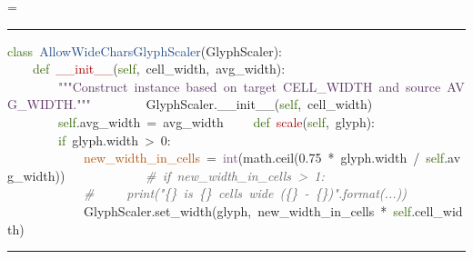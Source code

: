 \documentclass{article}
\makeatletter
\newcommand*{\ESHFontSize}{}
\newcommand*{\ESHFontFamily}{\ttfamily}
\newcommand*{\ESHBlockFontSize}{\ESHFontSize}
\newcommand*{\ESHBlockFontFamily}{\ESHFontFamily}
\newcommand*{\ESHBlockFont}{\ESHBlockFontSize\ESHBlockFontFamily}
\newcommand*{\ESHFallbackFontFamily}{\ESHFontFamily}
\newcommand*{\ESHFallbackFont}{\ESHFallbackFontFamily}
\newcommand*{\ESHNoHyphens}{\hyphenpenalty=10000}
\newcommand*{\ESHConstantSpace}{\spaceskip=\fontdimen2\font\xspaceskip=0pt}
\newcommand*{\ESHCenterInWidthOf}[2]
  {\settowidth\ESHtempdim{#1}%
   \makebox[\ESHtempdim][c]{#2}}
\newcommand*{\ESHIfFontChar}[1]
  {\iffontchar\font`#1{#1}\else{\ESHFallbackFont#1}\fi}
\def\ESHWithFallback#1{\ESHFallbackFont#1}}
\def\ESHWithFallback#1{\ESHIfFontChar{#1}}}}
\def\ESHWithFallback#1{%
     \ifnum\XeTeXfonttype\font>0%
       \ESHIfFontChar{#1}%
     \else%
       \setbox0=\hbox{\tracinglostchars=0\kern1sp#1\expandafter}%
       \ifnum\lastkern=1{\ESHFallbackFont#1}\else{#1}\fi
     \fi}}
\DeclareRobustCommand*{\ESHBlockSpecialChar}[1]
  {{\ESHCenterInWidthOf{\ESHBlockFontFamily{a}}{\ESHBlockFontFamily\ESHWithFallback{#1}}}}
\DeclareRobustCommand*{\ESHBlockUnicodeSubstitution}[1]
  {{\ESHCenterInWidthOf{\ESHBlockFontFamily{a}}{\ESHBlockFontFamily#1}}}
\newlength{\ESHCurFontSize}
\newcommand*{\ESHSetCurFontSize}{\setlength{\ESHCurFontSize}{\f@size pt}}
\DeclareRobustCommand*{\ESHInlineRaise}[2]
  {\ESHSetCurFontSize\raisebox{#1\ESHCurFontSize}{\relsize{-2}#2}}
\DeclareRobustCommand*{\ESHBlockRaise}[2]
  {\rlap{\ESHInlineRaise{#1}{#2}}\hphantom{#2}}
\newlength{\ESHBaselineskip}
\DeclareRobustCommand*{\ESHBlockStrut}[1]
  {\rule{0pt}{#1\ESHBaselineskip}}
\newcommand*{\ESHBlockSlantItalic}[1]{{\itshape{#1}}} %
\newcommand*{\ESHNonbreakingSpace}{~}
\let\ESHSpecialChar\ignorespaces%
\let\ESHUnicodeSubstitution\ignorespaces%
\let\ESHRaise\ignorespaces%
\let\ESHBol\ignorespaces%
\let\ESHEol\ignorespaces%
\let\ESHSpace\ignorespaces%
\let\ESHDash\ignorespaces%
\let\ESHSlantItalic\ignorespaces%
\DeclareRobustCommand*{\ESHBlockInternalSetup}
  {\def\ESHSpecialChar{\ESHBlockSpecialChar}\def\ESHUnicodeSubstitution{\ESHBlockUnicodeSubstitution}%
   \def\ESHRaise{\ESHBlockRaise}\def\ESHSlantItalic{\ESHBlockSlantItalic}%
   \setlength{\ESHBaselineskip}{\baselineskip}\def\ESHStrut{\ESHBlockStrut}%
   \def\ESHBol{\-}\def\ESHEol{\newline}\def\ESHSpace{\ESHNonbreakingSpace}\def\ESHDash{\hbox{-}\nobreak}}
\newcommand*{\ESHBlockBasicSetup}
  {\setlength{\parindent}{0pt}\raggedright\ESHNoHyphens%
   \ESHBlockFont\ESHConstantSpace}
\newcommand*{\ESHHook}{}
\newcommand*{\ESHBlockHook}{\ESHHook}
\newlength{\ESHSkip}
\newcommand*{\ESHNoBreakAddVSpace}[1]{\addpenalty{\@M}\addvspace{#1}}
\newenvironment{ESHBlock}
  {\par\ESHNoBreakAddVSpace{\ESHSkip}\bgroup\ESHBlockInternalSetup\ESHBlockBasicSetup\ESHBlockHook}
  {\par\egroup\addvspace{\ESHSkip}}
\renewcommand{\ESHFontFamily}{\UbuntuMono}
\renewcommand{\ESHFallbackFontFamily}{\XITSMath}
\renewenvironment{ESHBlock}{%
  \par\ESHNoBreakAddVSpace{\ESHSkip}\bgroup\ESHBlockInternalSetup\ESHBlockBasicSetup%
  \hrule\addvspace{0.5em}%
}{%
  \par\egroup\addvspace{0.5em}\hrule\addvspace{2\ESHSkip}%
}
\makeatother
\begin{document}
\begin{ESHBlock}
\ESHBol{}\textcolor[HTML]{346604}{class}\ESHSpace{}\textcolor[HTML]{204A87}{AllowWideCharsGlyphScaler}(GlyphScaler):\ESHEol
\ESHBol{}\ESHSpace{}\ESHSpace{}\ESHSpace{}\ESHSpace{}\textcolor[HTML]{346604}{def}\ESHSpace{}\textcolor[HTML]{A40000}{\_\_init\_\_}(\textcolor[HTML]{346604}{self},\ESHSpace{}cell\_width,\ESHSpace{}avg\_width):\ESHEol
\ESHBol{}\ESHSpace{}\ESHSpace{}\ESHSpace{}\ESHSpace{}\ESHSpace{}\ESHSpace{}\ESHSpace{}\ESHSpace{}\textcolor[HTML]{5C3566}{"""Construct\ESHSpace{}instance\ESHSpace{}based\ESHSpace{}on\ESHSpace{}target\ESHSpace{}CELL\_WIDTH\ESHSpace{}and\ESHSpace{}source\ESHSpace{}AVG\_WIDTH."""}\ESHEol
\ESHBol{}\ESHSpace{}\ESHSpace{}\ESHSpace{}\ESHSpace{}\ESHSpace{}\ESHSpace{}\ESHSpace{}\ESHSpace{}GlyphScaler.\_\_init\_\_(\textcolor[HTML]{346604}{self},\ESHSpace{}cell\_width)\ESHEol
\ESHBol{}\ESHSpace{}\ESHSpace{}\ESHSpace{}\ESHSpace{}\ESHSpace{}\ESHSpace{}\ESHSpace{}\ESHSpace{}\textcolor[HTML]{346604}{self}.avg\_width\ESHSpace{}=\ESHSpace{}avg\_width\ESHEol
\ESHBol{}\mbox{}\ESHEol
\ESHBol{}\ESHSpace{}\ESHSpace{}\ESHSpace{}\ESHSpace{}\textcolor[HTML]{346604}{def}\ESHSpace{}\textcolor[HTML]{A40000}{scale}(\textcolor[HTML]{346604}{self},\ESHSpace{}glyph):\ESHEol
\ESHBol{}\ESHSpace{}\ESHSpace{}\ESHSpace{}\ESHSpace{}\ESHSpace{}\ESHSpace{}\ESHSpace{}\ESHSpace{}\textcolor[HTML]{346604}{if}\ESHSpace{}glyph.width\ESHSpace{}{>}\ESHSpace{}0:\ESHEol
\ESHBol{}\ESHSpace{}\ESHSpace{}\ESHSpace{}\ESHSpace{}\ESHSpace{}\ESHSpace{}\ESHSpace{}\ESHSpace{}\ESHSpace{}\ESHSpace{}\ESHSpace{}\ESHSpace{}\textcolor[HTML]{B35000}{new\_width\_in\_cells}\ESHSpace{}=\ESHSpace{}\textcolor[HTML]{75507B}{int}(math.ceil(0.75\ESHSpace{}*\ESHSpace{}glyph.width\ESHSpace{}/\ESHSpace{}\textcolor[HTML]{346604}{self}.avg\_width))\ESHEol
\ESHBol{}\ESHSpace{}\ESHSpace{}\ESHSpace{}\ESHSpace{}\ESHSpace{}\ESHSpace{}\ESHSpace{}\ESHSpace{}\ESHSpace{}\ESHSpace{}\ESHSpace{}\ESHSpace{}\ESHSlantItalic{\textcolor[HTML]{5F615C}{\#\ESHSpace{}if\ESHSpace{}new\_width\_in\_cells\ESHSpace{}{>}\ESHSpace{}1:}}\ESHEol
\ESHBol{}\ESHSpace{}\ESHSpace{}\ESHSpace{}\ESHSpace{}\ESHSpace{}\ESHSpace{}\ESHSpace{}\ESHSpace{}\ESHSpace{}\ESHSpace{}\ESHSpace{}\ESHSpace{}\ESHSlantItalic{\textcolor[HTML]{5F615C}{\#\ESHSpace{}\ESHSpace{}\ESHSpace{}\ESHSpace{}\ESHSpace{}print("\{\}\ESHSpace{}is\ESHSpace{}\{\}\ESHSpace{}cells\ESHSpace{}wide\ESHSpace{}(\{\}\ESHSpace{}\ESHDash{}{>}\ESHSpace{}\{\})".format(...))}}\ESHEol
\ESHBol{}\ESHSpace{}\ESHSpace{}\ESHSpace{}\ESHSpace{}\ESHSpace{}\ESHSpace{}\ESHSpace{}\ESHSpace{}\ESHSpace{}\ESHSpace{}\ESHSpace{}\ESHSpace{}GlyphScaler.set\_width(glyph,\ESHSpace{}new\_width\_in\_cells\ESHSpace{}*\ESHSpace{}\textcolor[HTML]{346604}{self}.cell\_width)
\end{ESHBlock}
\end{document}
